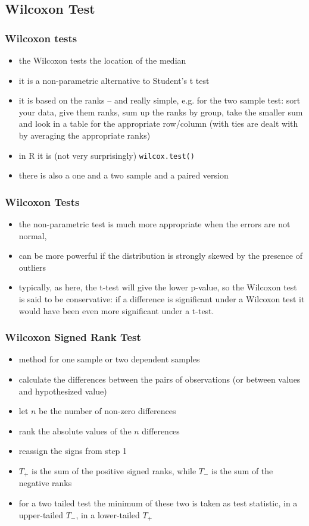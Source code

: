 \documentclass[xcolor={table}]{beamer}
\begin{document}
\subsection{Wilcoxon Test}
\begin{frame}\frametitle{Wilcoxon tests}
    \begin{itemize}
    \item the Wilcoxon tests the location of the median
    \item it is a non-parametric alternative to Student's t test
    \item it is based on the ranks -- and really simple, e.g. for the two sample test: sort your data, give them ranks, sum up the ranks by group, take the smaller sum and look in a table for the appropriate row/column (with ties are dealt with by averaging the appropriate ranks) 
    \item in R it is (not very surprisingly) \texttt{wilcox.test()}
    \item there is also a one and a two sample and a paired version
    \end{itemize}
\end{frame}

\begin{frame}[fragile]\frametitle{Wilcoxon Tests}
\begin{itemize}

\item the non-parametric test is much more appropriate when the errors are not normal, 
\item can be more powerful if the distribution is strongly skewed by the presence of outliers
\item typically, as here, the t-test will give the lower p-value, so the Wilcoxon test is said to be conservative: if a difference is significant under a Wilcoxon test it would have been even more significant under a t-test.
\end{itemize}
\end{frame}


\begin{frame}[fragile]\frametitle{Wilcoxon Signed Rank Test}
\begin{itemize}
\item method for one sample or two dependent samples
\item calculate the differences between the pairs of observations (or between values and hypothesized value)
\item let $n$ be the number of non-zero differences
\item rank the absolute values of the $n$ differences
\item reassign the signs from step 1
\item $T_+$ is the sum of the positive signed ranks, while $T_-$ is the sum of the negative ranks
\item for a two tailed test the minimum of these two is taken as test statistic, in a upper-tailed $T_-$, in a lower-tailed $T_+$
\end{itemize}
\end{frame}
\end{document}

